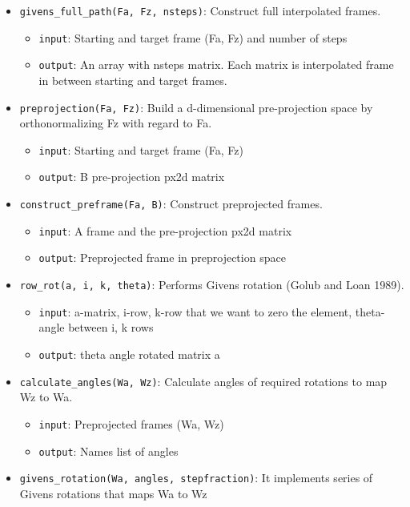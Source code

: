 \begin{itemize}
\tightlist
\item
  \texttt{givens\_full\_path(Fa,\ Fz,\ nsteps)}: Construct full interpolated frames.

  \begin{itemize}
  \tightlist
  \item
    \texttt{input}: Starting and target frame (Fa, Fz) and number of steps
  \item
    \texttt{output}: An array with nsteps matrix. Each matrix is interpolated frame in between starting and target frames.
  \end{itemize}
\item
  \texttt{preprojection(Fa,\ Fz)}: Build a d-dimensional pre-projection space by orthonormalizing Fz with regard to Fa.

  \begin{itemize}
  \tightlist
  \item
    \texttt{input}: Starting and target frame (Fa, Fz)
  \item
    \texttt{output}: B pre-projection px2d matrix
  \end{itemize}
\item
  \texttt{construct\_preframe(Fa,\ B)}: Construct preprojected frames.

  \begin{itemize}
  \tightlist
  \item
    \texttt{input}: A frame and the pre-projection px2d matrix
  \item
    \texttt{output}: Preprojected frame in preprojection space
  \end{itemize}
\item
  \texttt{row\_rot(a,\ i,\ k,\ theta)}: Performs Givens rotation (Golub and Loan 1989).

  \begin{itemize}
  \tightlist
  \item
    \texttt{input}: a-matrix, i-row, k-row that we want to zero the element, theta-angle between i, k rows
  \item
    \texttt{output}: theta angle rotated matrix a
  \end{itemize}
\item
  \texttt{calculate\_angles(Wa,\ Wz)}: Calculate angles of required rotations to map Wz to Wa.

  \begin{itemize}
  \tightlist
  \item
    \texttt{input}: Preprojected frames (Wa, Wz)
  \item
    \texttt{output}: Names list of angles
  \end{itemize}
\item
  \texttt{givens\_rotation(Wa,\ angles,\ stepfraction)}: It implements series of Givens rotations that maps Wa to Wz


\end{itemize}
